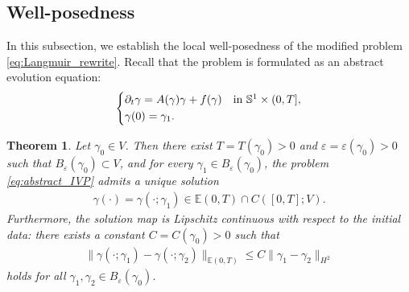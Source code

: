 \documentclass{article}
\newtheorem{theorem}{Theorem}[section]
\theoremstyle{remark}
\theoremstyle{definition}
\numberwithin{equation}{section}
\begin{document}
\subsection{Well-posedness}

In this subsection, we establish the local well-posedness of the modified problem \eqref{eq:Langmuir_rewrite}.
Recall that the problem is formulated as an abstract evolution equation:
\begin{equation}
    \begin{dcases*}
        \partial_t \gamma = A(\gamma)\gamma + f(\gamma) & in $\mathbb{S}^1\times(0,T]$,\\
        \gamma(0) = \gamma_1.
    \end{dcases*}
    \label{eq:abstract_IVP}
\end{equation}

\begin{theorem} \label{thm:existence}
    Let $\gamma_0\in V$.
    Then there exist $T=T(\gamma_0)>0$ and $\varepsilon=\varepsilon(\gamma_0)>0$ such that $B_\varepsilon(\gamma_0)\subset V$, and for every $\gamma_1\in B_\varepsilon(\gamma_0)$, the problem \eqref{eq:abstract_IVP} admits a unique solution
    \begin{align*}
        \gamma(\cdot)=\gamma(\cdot;\gamma_1)\in \mathbb{E}(0,T) \cap C([0,T];V).
    \end{align*}
    Furthermore, the solution map is Lipschitz continuous with respect to the initial data: there exists a constant $C=C(\gamma_0)>0$ such that
    \begin{align*}
        \|\gamma(\cdot;\gamma_1)-\gamma(\cdot;\gamma_2)\|_{\mathbb{E}(0,T)}\le C\|\gamma_1-\gamma_2\|_{H^2}
    \end{align*}
    holds for all $\gamma_1,\gamma_2\in B_\varepsilon(\gamma_0)$.
\end{theorem}
\end{document}
